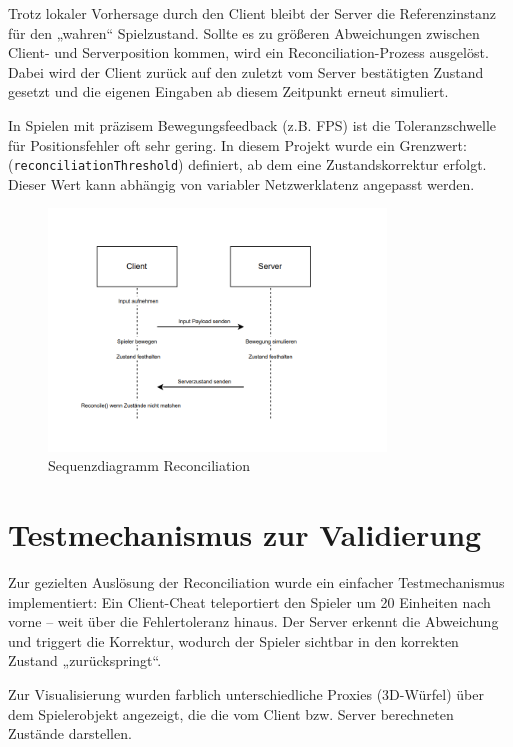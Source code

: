 Trotz lokaler Vorhersage durch den Client bleibt der Server die Referenzinstanz für den „wahren“ Spielzustand. Sollte es zu größeren Abweichungen zwischen Client- und Serverposition kommen, wird ein Reconciliation-Prozess ausgelöst. Dabei wird der Client zurück auf den zuletzt vom Server bestätigten Zustand gesetzt und die eigenen Eingaben ab diesem Zeitpunkt erneut simuliert.

In Spielen mit präzisem Bewegungsfeedback (z.B. FPS) ist die Toleranzschwelle für Positionsfehler oft sehr gering. In diesem Projekt wurde ein Grenzwert: \\ (\texttt{reconciliationThreshold}) definiert, ab dem eine Zustandskorrektur erfolgt. Dieser Wert kann abhängig von variabler Netzwerklatenz angepasst werden.

\begin{figure}[H] %
    \centering
    \includegraphics[width=0.8\textwidth]{figures/ReconciliationSeq.png}
    \caption{Sequenzdiagramm Reconciliation}
    \label{fig:logo}
\end{figure}

\section{Testmechanismus zur Validierung}

Zur gezielten Auslösung der Reconciliation wurde ein einfacher Testmechanismus implementiert: Ein Client-Cheat teleportiert den Spieler um 20 Einheiten nach vorne – weit über die Fehlertoleranz hinaus. Der Server erkennt die Abweichung und triggert die Korrektur, wodurch der Spieler sichtbar in den korrekten Zustand „zurückspringt“.

Zur Visualisierung wurden farblich unterschiedliche Proxies (3D-Würfel) über dem Spielerobjekt angezeigt, die die vom Client bzw. Server berechneten Zustände darstellen.

